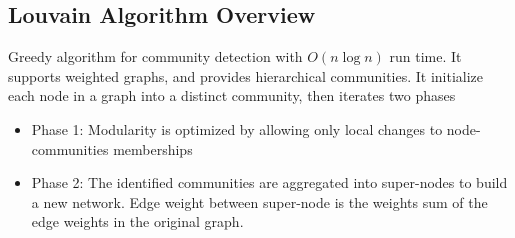 \subsection{Louvain Algorithm Overview} 
Greedy algorithm for community detection with $O(n \log n)$ run time. It supports weighted graphs, and provides hierarchical communities. It initialize each node in a graph into a distinct community, then  iterates two phases 
    \begin{itemize}
        \item Phase 1: Modularity is optimized by allowing only local changes to node-communities memberships
        \item Phase 2: The identified communities are aggregated into super-nodes to build a new network. Edge weight between super-node is the weights sum of the edge weights in the original graph. 
    \end{itemize}

